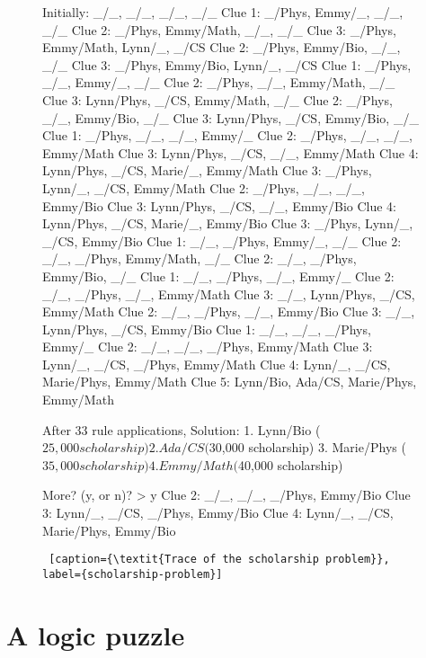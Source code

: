 \begin{figure}[!b]  %
    \flushright
\begin{minipage}[c]{0.45\textwidth}
\begin{python1}
Initially: _/_, _/_, _/_, _/_
Clue 1: _/Phys, Emmy/_, _/_, _/_
Clue 2: _/Phys, Emmy/Math, _/_, _/_
Clue 3: _/Phys, Emmy/Math, Lynn/_, _/CS
Clue 2: _/Phys, Emmy/Bio, _/_, _/_
Clue 3: _/Phys, Emmy/Bio, Lynn/_, _/CS
Clue 1: _/Phys, _/_, Emmy/_, _/_
Clue 2: _/Phys, _/_, Emmy/Math, _/_
Clue 3: Lynn/Phys, _/CS, Emmy/Math, _/_
Clue 2: _/Phys, _/_, Emmy/Bio, _/_
Clue 3: Lynn/Phys, _/CS, Emmy/Bio, _/_
Clue 1: _/Phys, _/_, _/_, Emmy/_
Clue 2: _/Phys, _/_, _/_, Emmy/Math
Clue 3: Lynn/Phys, _/CS, _/_, Emmy/Math
Clue 4: Lynn/Phys, _/CS, Marie/_, Emmy/Math
Clue 3: _/Phys, Lynn/_, _/CS, Emmy/Math
Clue 2: _/Phys, _/_, _/_, Emmy/Bio
Clue 3: Lynn/Phys, _/CS, _/_, Emmy/Bio
Clue 4: Lynn/Phys, _/CS, Marie/_, Emmy/Bio
Clue 3: _/Phys, Lynn/_, _/CS, Emmy/Bio
Clue 1: _/_, _/Phys, Emmy/_, _/_
Clue 2: _/_, _/Phys, Emmy/Math, _/_
Clue 2: _/_, _/Phys, Emmy/Bio, _/_
Clue 1: _/_, _/Phys, _/_, Emmy/_
Clue 2: _/_, _/Phys, _/_, Emmy/Math
Clue 3: _/_, Lynn/Phys, _/CS, Emmy/Math
Clue 2: _/_, _/Phys, _/_, Emmy/Bio
Clue 3: _/_, Lynn/Phys, _/CS, Emmy/Bio
Clue 1: _/_, _/_, _/Phys, Emmy/_
Clue 2: _/_, _/_, _/Phys, Emmy/Math
Clue 3: Lynn/_, _/CS, _/Phys, Emmy/Math
Clue 4: Lynn/_, _/CS, Marie/Phys, Emmy/Math
Clue 5: Lynn/Bio, Ada/CS, Marie/Phys, Emmy/Math

After 33 rule applications,
Solution: 
	1. Lynn/Bio	($25,000 scholarship)
	2. Ada/CS	($30,000 scholarship)
	3. Marie/Phys	($35,000 scholarship)
	4. Emmy/Math	($40,000 scholarship)

More? (y, or n)? > y
Clue 2: _/_, _/_, _/Phys, Emmy/Bio
Clue 3: Lynn/_, _/CS, _/Phys, Emmy/Bio
Clue 4: Lynn/_, _/CS, Marie/Phys, Emmy/Bio
\end{python1}\linv
\begin{lstlisting} [caption={\textit{Trace of the scholarship problem}}, label={scholarship-problem}]
\end{lstlisting}
\end{minipage} \linv
\end{figure}

\section{A logic puzzle}\label{sec:logic-puzzle}


